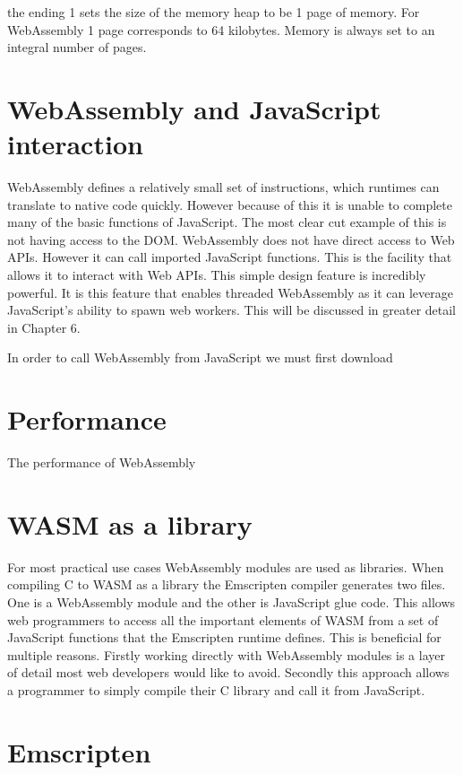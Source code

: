 \documentclass[11pt]{book}
\begin{document}
the ending 1 sets the size of the memory heap to be 1 page of memory. For WebAssembly 1 page corresponds to 64 kilobytes. Memory is always set to an integral number of pages.


\section{WebAssembly and JavaScript interaction}

WebAssembly defines a relatively small set of instructions, which runtimes can translate to native code quickly. However because of this it is unable to complete many of the basic functions of JavaScript. The most clear cut example of this is not having access to the DOM. 
WebAssembly does not have direct access to Web APIs. However it can call imported JavaScript functions. This is the facility that allows it to interact with Web APIs. This simple design feature is incredibly powerful. It is this feature that enables threaded WebAssembly as it can leverage JavaScript's ability to spawn web workers. This will be discussed in greater detail in Chapter 6.

In order to call WebAssembly from JavaScript we must first download 

\section{Performance}

The performance of WebAssembly

\section{WASM as a library}

For most practical use cases WebAssembly modules are used as libraries. When compiling C to WASM as a library the Emscripten compiler generates two files. One is a WebAssembly module and the other is JavaScript glue code. This allows web programmers to access all the important elements of WASM from a set of JavaScript functions that the Emscripten runtime defines. This is beneficial for multiple reasons. Firstly working directly with WebAssembly modules is a layer of detail most web developers would like to avoid. Secondly this approach allows a programmer to simply compile their C library and call it from JavaScript. 


\section{Emscripten}
\end{document}
